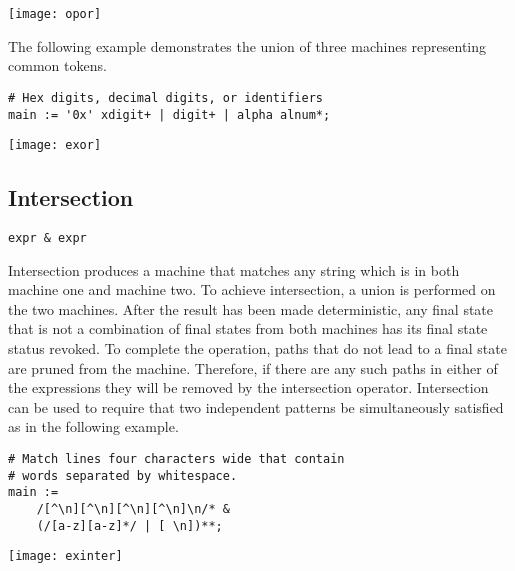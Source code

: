 \documentclass[letterpaper,11pt,oneside]{book}
\newcommand{\verbspace}{\vspace{10pt}}
\newcommand{\graphspace}{\vspace{10pt}}
\newenvironment{inline_code}{\def\baselinestretch{1}\vspace{12pt}\small}{}
\begin{document}
\graphspace
\begin{center}
\texttt{[image: opor]}
\end{center}
\graphspace

The following example demonstrates the union of three machines representing
common tokens.

\begin{inline_code}
\begin{verbatim}
# Hex digits, decimal digits, or identifiers
main := '0x' xdigit+ | digit+ | alpha alnum*;
\end{verbatim}
\end{inline_code}

\graphspace
\begin{center}
\texttt{[image: exor]}
\end{center}

\subsection{Intersection}

\verb|expr & expr|
\verbspace

Intersection produces a machine that matches any
string which is in both machine one and machine two. To achieve intersection, a
union is performed on the two machines. After the result has been made
deterministic, any final state that is not a combination of final states from
both machines has its final state status revoked. To complete the operation,
paths that do not lead to a final state are pruned from the machine. Therefore,
if there are any such paths in either of the expressions they will be removed
by the intersection operator.  Intersection can be used to require that two
independent patterns be simultaneously satisfied as in the following example.

\begin{inline_code}
\begin{verbatim}
# Match lines four characters wide that contain 
# words separated by whitespace.
main :=
    /[^\n][^\n][^\n][^\n]\n/* &
    (/[a-z][a-z]*/ | [ \n])**;
\end{verbatim}
\end{inline_code}

\graphspace
\begin{center}
\texttt{[image: exinter]}
\end{center}
\end{document}
